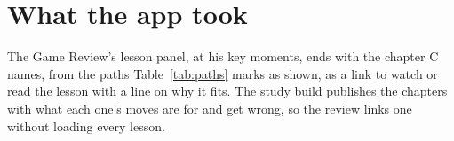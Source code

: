 \documentclass[11pt]{article}
\begin{document}
\section{What the app took}

The Game Review's lesson panel, at his key moments, ends with the chapter C names, from the paths
Table~\ref{tab:paths} marks as shown, as a link to watch or read the lesson with a line on why it
fits. The study build publishes the chapters with what each one's moves are for and get wrong, so
the review links one without loading every lesson.
\end{document}
